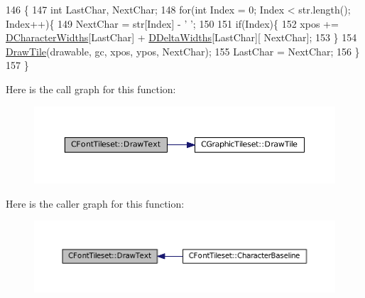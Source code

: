 \begin{DoxyCode}
146                                                                                                        \{
147     \textcolor{keywordtype}{int} LastChar, NextChar;
148     \textcolor{keywordflow}{for}(\textcolor{keywordtype}{int} Index = 0; Index < str.length(); Index++)\{
149         NextChar = str[Index] - \textcolor{charliteral}{' '};
150         
151         \textcolor{keywordflow}{if}(Index)\{
152             xpos += \hyperlink{classCFontTileset_ad25347b5350a8380be8c550d9f2e2798}{DCharacterWidths}[LastChar] + \hyperlink{classCFontTileset_a1e253853e14282e9582a7f47dace8f70}{DDeltaWidths}[LastChar][
      NextChar]; 
153         \}
154         \hyperlink{classCGraphicTileset_afefd501a74e95295b7cd2dc868dcbbcb}{DrawTile}(drawable, gc, xpos, ypos, NextChar);
155         LastChar = NextChar;
156     \}
157 \}
\end{DoxyCode}
Here is the call graph for this function\+:\nopagebreak
\begin{figure}[H]
\begin{center}
\leavevmode
\includegraphics[width=350pt]{classCFontTileset_a4121603694e96e93378e079edd27086e_cgraph}
\end{center}
\end{figure}
Here is the caller graph for this function\+:\nopagebreak
\begin{figure}[H]
\begin{center}
\leavevmode
\includegraphics[width=350pt]{classCFontTileset_a4121603694e96e93378e079edd27086e_icgraph}
\end{center}
\end{figure}
\hypertarget{classCFontTileset_a987f13f64865891b7bf8b10f0b519fb7}{}\label{classCFontTileset_a987f13f64865891b7bf8b10f0b519fb7} 
